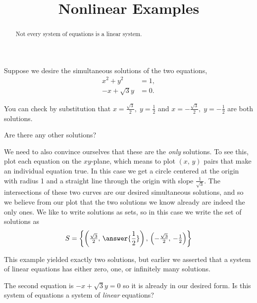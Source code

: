 \documentclass{ximera}
\title{Nonlinear Examples}
\begin{document}
\begin{abstract}
  Not every system of equations is a linear system.
\end{abstract}
\maketitle

\begin{example}
  Suppose we desire the simultaneous solutions of the two equations,
  \begin{align*}
    x^2+y^2&=1,\\
    -x+\sqrt{3}y&=0.
  \end{align*}
  
  You can check by substitution that $x=\tfrac{\sqrt{3}}{2},\;y=\tfrac{1}{2}$ and $x=-\tfrac{\sqrt{3}}{2},\;y=-\tfrac{1}{2}$ are both solutions.

  \begin{question}
    Are there any other solutions?
    \begin{multipleChoice}
    \end{multipleChoice}
    
    \begin{question}
      We need to also convince ourselves that these are the
      \textit{only} solutions.  To see this, plot each equation on the
      $xy$-plane, which means to plot $(x,\,y)$ pairs that make an
      individual equation true.  In this case we get a circle centered
      at the origin with radius 1 and a straight line through the origin
      with slope $\tfrac{1}{\sqrt{3}}$.  The intersections of these two
      curves are our desired simultaneous solutions, and so we believe
      from our plot that the two solutions we know already are indeed
      the only ones.  We like to write solutions as sets, so in this
      case we write the set of solutions as
      \[
        S=\set{\left(\tfrac{\sqrt{3}}{2},\,\answer{\frac{1}{2}}\right),\,\left(-\tfrac{\sqrt{3}}{2},\,-\tfrac{1}{2}\right)}
      \]
      
      \begin{question}
        This example yielded exactly two solutions, but earlier we asserted that a system of linear equations has either zero, one, or infinitely many solutions.
        
        The second equation is $-x+\sqrt{3}y=0$ so it is already in our desired form.  Is this system of equations a system of \textit{linear} equations?
        \begin{multipleChoice}
        \end{multipleChoice}
        

\end{question}
\end{question}
\end{question}
\end{example}
\end{document}

